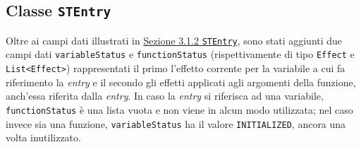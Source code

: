 \documentclass[../report.tex]{subfiles}
\begin{document}
\subsection[Classe STEntry]{Classe \texttt{STEntry}}\label{ss:stentry-effetti}
Oltre ai campi dati illustrati in \hyperref[ss:stentry]{Sezione 3.1.2 \texttt{STEntry}}, sono stati aggiunti due campi dati \verb|variableStatus| e \verb|functionStatus| (rispettivamente di tipo \verb|Effect| e \verb|List<Effect>|) rappresentati il primo l'effetto corrente per la variabile a cui fa riferimento la \textit{entry} e il secondo gli effetti applicati agli argomenti della funzione, anch'essa riferita dalla \textit{entry}.
In caso la \textit{entry} si riferisca ad una variabile, \verb|functionStatus| è una lista vuota e non viene in alcun modo utilizzata; nel caso invece sia una funzione, \verb|variableStatus| ha il valore \verb|INITIALIZED|, ancora una volta inutilizzato.
\end{document}
